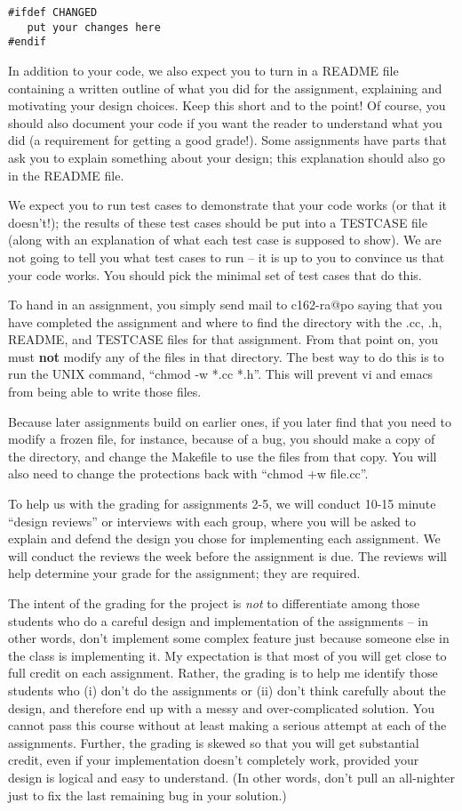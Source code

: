 \begin{verbatim}
#ifdef CHANGED
   put your changes here
#endif
\end{verbatim}

In addition to your code, we also expect you to turn in a
README file containing a written outline of what you did for
the assignment, explaining and motivating your design choices.
Keep this short and to the point!  Of course, you should also document
your code if you want the reader to understand what you did (a requirement
for getting a good grade!).  Some assignments have parts that ask you
to explain something about your design; this explanation should also go
in the README file.

We expect you to run test cases to demonstrate that your
code works (or that it doesn't!); the results of these test
cases should be put into a TESTCASE file (along with an explanation
of what each test case is supposed to show).  We are not going to tell
you what test cases to run -- it is up to you to convince us
that your code works.  You should pick the minimal set of test cases
that do this.

To hand in an assignment, you simply send mail to c162-ra@po
saying that you have completed the assignment and where to find
the directory with the .cc, .h, README, and TESTCASE files for
that assignment.  From that point on, you must {\bf not} modify any
of the files in that directory.  The best way to do
this is to run the
UNIX command, ``chmod -w *.cc *.h''.  This will prevent vi and emacs
from being able to write those files.

Because later assignments build on earlier ones, if you later find
that you need to modify a frozen file, for instance, because of a bug,
you should make a copy of the directory, and change the Makefile
to use the files from that copy.
You will also need to change the protections back with ``chmod +w file.cc''.

To help us with the grading for assignments 2-5,
we will conduct 10-15 minute ``design reviews''
or interviews with each group, where you will be asked to explain
and defend the design you chose for implementing each assignment.
We will conduct the reviews the week before the assignment is due.
The reviews will help determine your grade for the assignment; they
are required.

The intent of the grading for the project is {\em not} to differentiate
among those students who do a careful design and implementation
of the assignments -- in other words, don't implement some complex
feature just because someone else in the class is implementing it.
My expectation is that most of you will get close to full credit on
each assignment.  Rather, the grading is to help me identify those
students who (i) don't do the assignments or (ii) don't think carefully
about the design, and therefore end up with a messy and over-complicated
solution.  You cannot pass this course without at least making a
serious attempt at each of the assignments.
Further, the grading is skewed so that you will get substantial credit,
even if your implementation doesn't completely work, provided your
design is logical and easy to understand.  (In other words, don't
pull an all-nighter just to fix the last remaining bug in your solution.)

